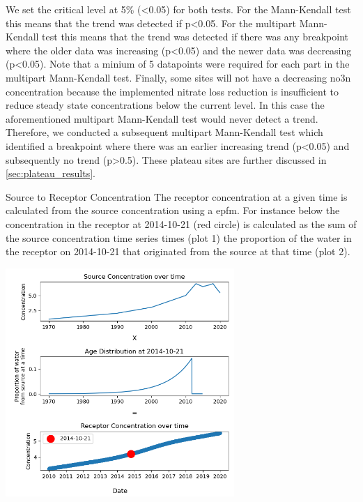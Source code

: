 We set the critical level at 5\% (<0.05) for both tests.
For the Mann-Kendall test this means that the trend was detected if p<0.05. For the multipart Mann-Kendall test this means that the trend was detected if there was any breakpoint where the older data was increasing (p<0.05) and the newer data was decreasing (p<0.05).
Note that a minium of 5 datapoints were required for each part in the multipart Mann-Kendall test.
Finally, some sites will not have a decreasing \gls{no3n} concentration because the implemented nitrate loss reduction is insufficient to reduce steady state concentrations below the current level.
In this case the aforementioned multipart Mann-Kendall test would never detect a trend.
Therefore, we conducted a subsequent multipart Mann-Kendall test which identified a breakpoint where there was an earlier increasing trend (p<0.05) and subsequently no trend (p>0.5). These plateau sites are further discussed in \autoref{sec:plateau_results}.

\begin{breakawaybox}[label={box:mrttoconc}]{Source to Receptor Concentration}
    The receptor concentration at a given time is calculated from the source concentration using a \gls{epfm}.
    For instance below the concentration in the receptor at 2014-10-21 (red circle) is calculated as the sum of the source concentration time series times (plot 1) the proportion of the water in the receptor on 2014-10-21 that originated from the source at that time (plot 2).
    \\
    \begin{center}
        \includegraphics[width=0.65\textwidth]{../GeneratedData/mrt_explain_fig}
    \end{center}
\end{breakawaybox}